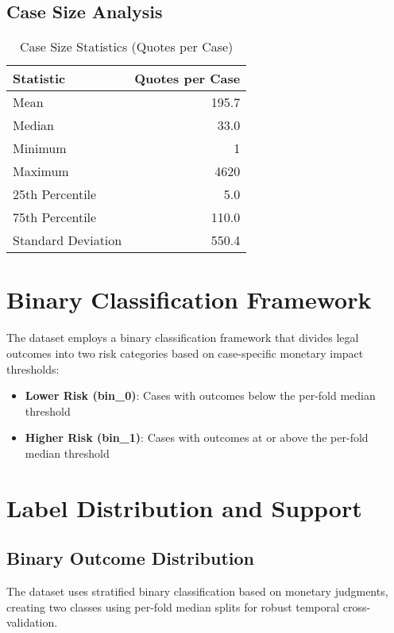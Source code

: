 \documentclass[11pt,a4paper]{article}
\begin{document}
\subsection{Case Size Analysis}

\begin{table}[H]
\centering
\caption{Case Size Statistics (Quotes per Case)}
\begin{tabular}{lr}
\toprule
\textbf{Statistic} & \textbf{Quotes per Case} \\
\midrule
Mean & 195.7 \\
Median & 33.0 \\
Minimum & 1 \\
Maximum & 4620 \\
25th Percentile & 5.0 \\
75th Percentile & 110.0 \\
Standard Deviation & 550.4 \\
\bottomrule
\end{tabular}
\end{table}

\section{Binary Classification Framework}

The dataset employs a binary classification framework that divides legal outcomes into two risk categories based on case-specific monetary impact thresholds:

\begin{itemize}
\item \textbf{Lower Risk (bin\_0)}: Cases with outcomes below the per-fold median threshold
\item \textbf{Higher Risk (bin\_1)}: Cases with outcomes at or above the per-fold median threshold
\end{itemize}

\section{Label Distribution and Support}

\subsection{Binary Outcome Distribution}

The dataset uses stratified binary classification based on monetary judgments, creating two classes using per-fold median splits for robust temporal cross-validation.
\end{document}
